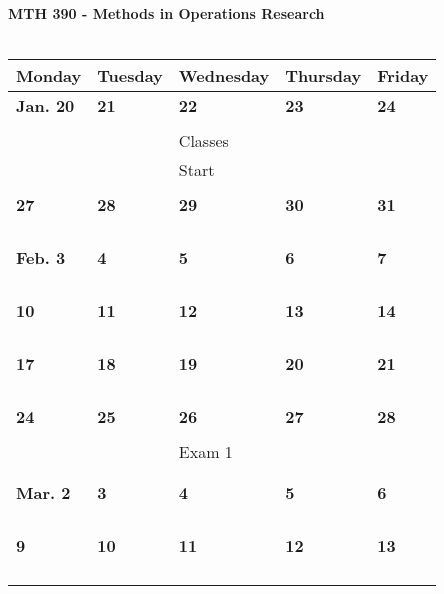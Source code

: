\documentclass[letter, 12pt]{article}
\begin{document}
\begin{center}
{\bf MTH 390 - Methods in Operations Research}\\
\ \\
\begin{tabular}{|l|l|l|l|l|}
\hline
{\bf \phantom{xx}Monday\phantom{x}} & {\bf \phantom{xx}Tuesday\phantom{x}} & {\bf \phantom{x}Wednesday\phantom{}} & {\bf \phantom{x}Thursday\phantom{x}} & {\bf \phantom{xx}Friday\phantom{xx}} \\
\hline
\textbf{Jan. 20}&\textbf{21}&\textbf{22}&\textbf{23}&\textbf{24}\\
&  &  &  & \\
&  & Classes &  & \\
&  & Start &  & \\
&  &  &  & \\
\hline
\textbf{27}&\textbf{28}&\textbf{29}&\textbf{30}&\textbf{31}\\
&  &  &  & \\
&  &  &  & \\
&  &  &  & \\
&  &  &  & \\
\hline
\textbf{Feb. 3}&\textbf{4}&\textbf{5}&\textbf{6}&\textbf{7}\\
&  &  &  & \\
&  &  &  & \\
&  &  &  & \\
&  &  &  & \\
\hline
\textbf{10}&\textbf{11}&\textbf{12}&\textbf{13}&\textbf{14}\\
&  &  &  & \\
&  &  &  & \\
&  &  &  & \\
&  &  &  & \\
\hline
\textbf{17}&\textbf{18}&\textbf{19}&\textbf{20}&\textbf{21}\\
&  &  &  & \\
&  &  &  & \\
&  &  &  & \\
&  &  &  & \\
\hline
\textbf{24}&\textbf{25}&\textbf{26}&\textbf{27}&\textbf{28}\\
&  &  &  & \\
&  &Exam 1  &  & \\
&  &  &  & \\
&  &  &  & \\
\hline
\textbf{Mar. 2}&\textbf{3}&\textbf{4}&\textbf{5}&\textbf{6}\\
&  &  &  & \\
&  &  &  & \\
&  &  &  & \\
&  &  &  & \\
\hline
\textbf{9}&\textbf{10}&\textbf{11}&\textbf{12}&\textbf{13}\\
&  &  &  & \\
&  &  &  & \\
&  &  &  & \\
&  &  &  & \\
\hline
\end{tabular}
\end{center}
\end{document}
